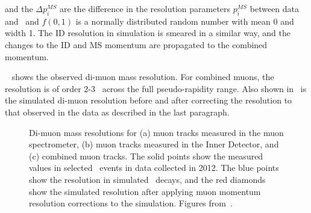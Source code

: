 and the $ \Delta p_{i}^{MS} $ are the difference in the resolution parameters $
p_{i}^{MS} $ between data and \mcsim\ and $f(0,1)$ is a normally distributed
random number with mean 0 and width 1. The ID resolution in simulation is
smeared in a similar way, and the changes to the ID and MS momentum are propagated
to the combined momentum.



~ shows the observed di-muon mass resolution. For
combined muons, the resolution is of order 2-3 \gev\ across the full
pseudo-rapidity range. Also shown in~ is the simulated
di-muon resolution before and after correcting the resolution to that observed
in the data as described in the last paragraph.

\begin{figure}[h]
\centering
    \caption[Di-muon mass resolutions for muon tracks measured in the muon
    spectrometer, muon tracks measured in the Inner Detector, and combined muon
    tracks. ]{Di-muon mass resolutions for (a) muon tracks measured in the muon
    spectrometer, (b) muon tracks measured in the Inner Detector, and (c) combined
    muon tracks. The solid points show the measured values in selected \Zmm\ events
    in data collected in 2012. The blue points show the resolution in simulated
    \Zmm\ decays, and the red diamonds show the simulated resolution after applying
    muon momentum resolution corrections to the simulation. Figures
    from~\cite{MuonPerfPlots2012}.}
\label{fig:mu-resolution-dimu}
\end{figure}

